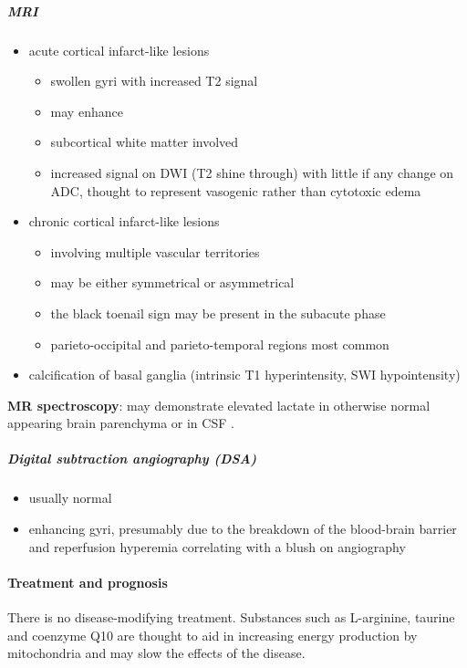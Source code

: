 \subparagraph{MRI}

\begin{itemize}
	\item
	acute cortical infarct-like lesions
	
	\begin{itemize}
		\item
		swollen gyri with increased T2 signal
		\item
		may enhance
		\item
		subcortical white matter involved
		\item
		increased signal on DWI (T2 shine through) with little if any change on ADC, thought to represent vasogenic rather than cytotoxic edema 
	\end{itemize}
	\item
	chronic cortical infarct-like lesions
	
	\begin{itemize}
		\item
		involving multiple vascular territories
		\item
		may be either symmetrical or asymmetrical
		\item
		the black toenail sign may be present in the subacute phase
		\item
		parieto-occipital and parieto-temporal regions most common
	\end{itemize}
	\item
	calcification of basal ganglia (intrinsic T1 hyperintensity, SWI hypointensity)
\end{itemize}

\textbf{MR spectroscopy}: may demonstrate elevated lactate in otherwise normal appearing brain parenchyma or in CSF .


\subparagraph{Digital subtraction angiography (DSA)}

\begin{itemize}
	\item
	usually normal
	\item
	enhancing gyri, presumably due to the breakdown of the blood-brain barrier and reperfusion hyperemia correlating with a blush on angiography 
\end{itemize}

\paragraph{Treatment and prognosis}

There is no disease-modifying treatment. Substances such as L-arginine, taurine and coenzyme Q10 are thought to aid in increasing energy production by mitochondria and may slow the effects of the disease.

